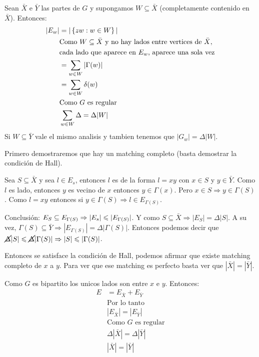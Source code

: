 \documentclass[12pt,a4paper]{article}
\begin{document}
Sean $\bar{X}$ e $\bar{Y}$ las partes de $G$ y supongamos $W \subseteq \bar{X}$ 
(completamente contenido en $\bar{X}$). Entonces:
\begin{align*}
    |E_{w}| &= |\left\lbrace zw: w\in W \right\rbrace| \\
    &\text{Como $W\subseteq \bar{X}$ y no hay lados entre vertices de $\bar{X}$},\\ 
    &\text{cada lado que aparece en $E_{w}$, aparece una sola vez} \\
    &=\sum_{w\in W} |\Gamma(w)|\\
    &=\sum_{w\in W} \delta(w)\\
    &\text{Como $G$ es regular}\\
    &\sum_{w\in W} \Delta = \Delta |W|
\end{align*}
Si $W \subseteq \bar{Y}$ vale el mismo analisis y tambien tenemos que $|G_{w}| = \Delta |W|$.
\medskip

Primero demostraremos que hay un matching completo (basta demostrar la condición 
de Hall).
\medskip

Sea $S \subseteq \bar{X}$ y sea $l \in E_{s}$, entonces $l$ es de la forma $l=xy$ 
con $x\in S$ y $y\in \bar{Y}$. Como $l$ es lado, entonces $y$ es vecino de $x$ 
entonces $y\in \Gamma(x)$. Pero $x\in S \Rightarrow y\in \Gamma(S)$. Como $l=xy$ 
entonces si $y\in \Gamma(S) \Rightarrow l\in E_{\Gamma(S)}$.
\medskip

Conclusión: $E_{S} \subseteq E_{\Gamma(S)} \Rightarrow |E_{s}| \leqslant |E_{\Gamma(S)}|$. 
Y como $S \subseteq \bar{X} \Rightarrow |E_{S}| = \Delta |S|$. A su vez, 
$\Gamma(S) \subseteq \bar{Y} \Rightarrow |E_{\Gamma(S)}| = \Delta |\Gamma(S)|$. 
Entonces podemos decir que 
$\cancel{\Delta} |S| \leqslant \cancel{\Delta} |\Gamma(S)| \Rightarrow |S| \leqslant |\Gamma(S)|$.
\medskip

Entonces se satisface la condición de Hall, podemos afirmar que existe matching 
completo de $x$ a $y$. Para ver que ese matching es perfecto basta ver que 
$|\bar{X}| = |\bar{Y}|$.
\medskip

Como $G$ es bipartito los unicos lados son entre $x$ e $y$. Entonces:
\begin{align*}
    E &= E_{\bar{X}} + E_{\bar{Y}}\\
    &\text{Por lo tanto}\\
    &|E_{\bar{X}}| = |E_{\bar{Y}}|\\
    &\text{Como $G$ es regular}\\
    &\Delta |\bar{X}| = \Delta |\bar{Y}|\\
    &|\bar{X}| = |\bar{Y}|
\end{align*}
\end{document}

